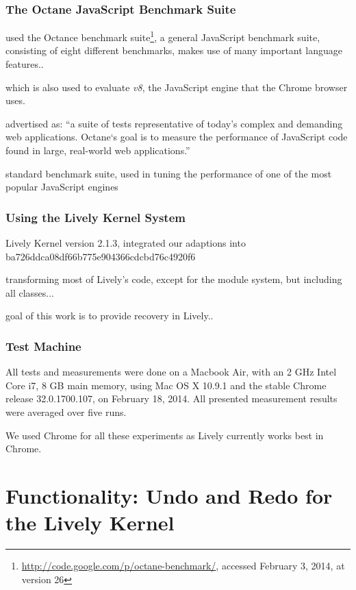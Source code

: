 \subsubsection{The Octane JavaScript Benchmark Suite}

used the Octance benchmark suite\footnote{\url{http://code.google.com/p/octane-benchmark/}, accessed February 3, 2014, at version 26}, 
a general JavaScript benchmark suite, consisting of eight different benchmarks, makes use of many important language features..

which is also used to evaluate \emph{v8}, the JavaScript engine that the Chrome browser uses.

advertised as: ``a suite of tests representative of today’s complex and demanding web applications. Octane‘s goal is to measure the performance of JavaScript code found in large, real-world web applications.''

standard benchmark suite, used in tuning the performance of one of the most popular JavaScript engines


\subsubsection{Using the Lively Kernel System}

Lively Kernel version 2.1.3, integrated our adaptions into ba726ddca08df66b775e904366cdcbd76c4920f6

transforming most of Lively's code, except for the module system, but including all classes...

goal of this work is to provide recovery in Lively..

\subsubsection{Test Machine}

All tests and measurements were done on a Macbook Air, with an 2 GHz Intel Core i7, 8 GB main memory, using Mac OS X 10.9.1 and the stable Chrome release 32.0.1700.107, on February 18, 2014.
All presented measurement results were averaged over five runs.

We used Chrome for all these experiments as Lively currently works best in Chrome.







\section{Functionality: Undo and Redo for the Lively Kernel} \label{sec:DISCUSSION:1}

